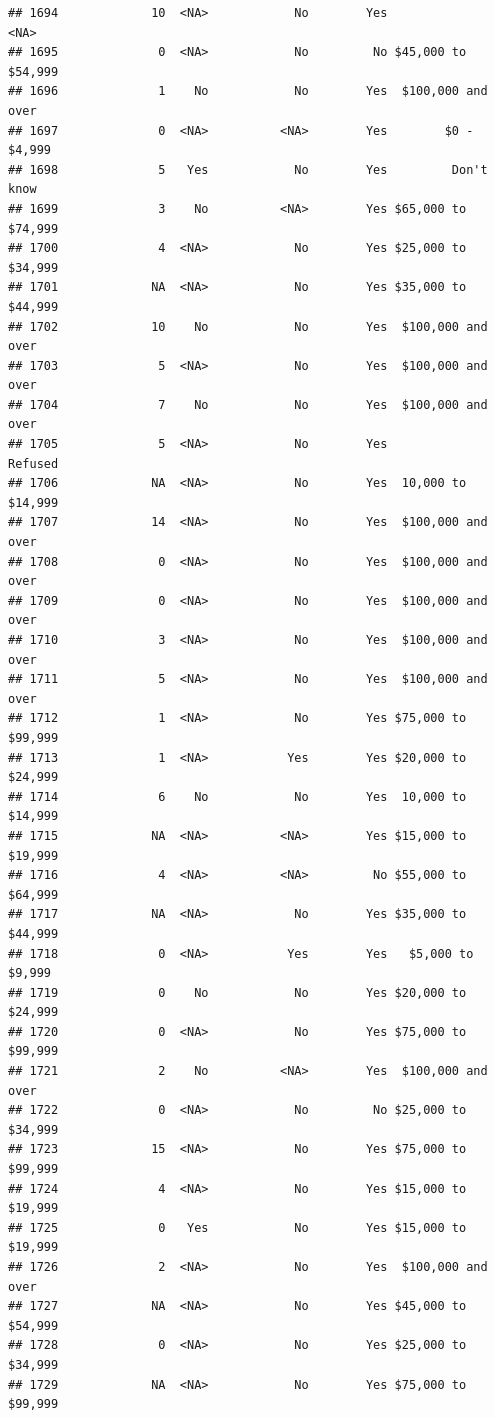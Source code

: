 \documentclass[man]{apa6}
\begin{document}
\begin{verbatim}
## 1694             10  <NA>            No        Yes               <NA>
## 1695              0  <NA>            No         No $45,000 to $54,999
## 1696              1    No            No        Yes  $100,000 and over
## 1697              0  <NA>          <NA>        Yes        $0 - $4,999
## 1698              5   Yes            No        Yes         Don't know
## 1699              3    No          <NA>        Yes $65,000 to $74,999
## 1700              4  <NA>            No        Yes $25,000 to $34,999
## 1701             NA  <NA>            No        Yes $35,000 to $44,999
## 1702             10    No            No        Yes  $100,000 and over
## 1703              5  <NA>            No        Yes  $100,000 and over
## 1704              7    No            No        Yes  $100,000 and over
## 1705              5  <NA>            No        Yes            Refused
## 1706             NA  <NA>            No        Yes  10,000 to $14,999
## 1707             14  <NA>            No        Yes  $100,000 and over
## 1708              0  <NA>            No        Yes  $100,000 and over
## 1709              0  <NA>            No        Yes  $100,000 and over
## 1710              3  <NA>            No        Yes  $100,000 and over
## 1711              5  <NA>            No        Yes  $100,000 and over
## 1712              1  <NA>            No        Yes $75,000 to $99,999
## 1713              1  <NA>           Yes        Yes $20,000 to $24,999
## 1714              6    No            No        Yes  10,000 to $14,999
## 1715             NA  <NA>          <NA>        Yes $15,000 to $19,999
## 1716              4  <NA>          <NA>         No $55,000 to $64,999
## 1717             NA  <NA>            No        Yes $35,000 to $44,999
## 1718              0  <NA>           Yes        Yes   $5,000 to $9,999
## 1719              0    No            No        Yes $20,000 to $24,999
## 1720              0  <NA>            No        Yes $75,000 to $99,999
## 1721              2    No          <NA>        Yes  $100,000 and over
## 1722              0  <NA>            No         No $25,000 to $34,999
## 1723             15  <NA>            No        Yes $75,000 to $99,999
## 1724              4  <NA>            No        Yes $15,000 to $19,999
## 1725              0   Yes            No        Yes $15,000 to $19,999
## 1726              2  <NA>            No        Yes  $100,000 and over
## 1727             NA  <NA>            No        Yes $45,000 to $54,999
## 1728              0  <NA>            No        Yes $25,000 to $34,999
## 1729             NA  <NA>            No        Yes $75,000 to $99,999

\end{verbatim}
\end{document}
